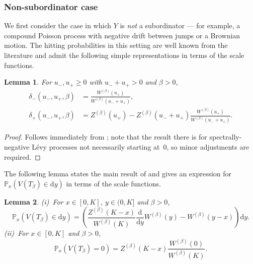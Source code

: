 \documentclass[reqno,12pt]{amsart}
\newtheorem{lemma}{Lemma}
\begin{document}
\subsubsection*{Non-subordinator case}\label{sec: prelim non-sub}
We first consider the case in which $Y$ is {\it not} a subordinator — for example, a compound Poisson process with negative drift between jumps or a Brownian motion. The hitting probabilities in this setting are well known from the literature and admit the following simple representations in terms of the scale functions.
\begin{lemma}\label{lemma: deltas Lévy non subord}
    For $u_-, u_+ \geqslant 0$ with $u_-+u_+ > 0$ and $\beta>0$,
    \begin{align*}
        \delta_{-}(u_-, u_+, \beta) &= \frac{W^{(\beta)}(u_+)}{W^{(\beta)}(u_- + u_+)}, \\
        \delta_{+}(u_-, u_+, \beta) &= Z^{(\beta)}(u_+) -  Z^{(\beta)}(u_-+ u_+) \frac{W^{(\beta)}(u_+)}{W^{(\beta)}(u_- + u_+)}.
    \end{align*}
\end{lemma}
\begin{proof}
    Follows immediately from \cite[Theorem 8.1]{KYP}; note that the result there is for spectrally-negative L\'evy processes not necessarily starting at~$0$, so minor adjustments are required.
\end{proof}




The following lemma states the main result of \cite{IP} and gives an expression for $\mathbb{P}_x(V(T_\beta) \in \mathrm{d}y)$ in terms of the scale functions.

\begin{lemma}\label{lemma: dist W init x}
    {\em (i)}~For $x\in[0,K]$, $y\in(0,K]$ and $\beta>0$,
    \begin{equation}\label{eq: dens W init x Levy}
        \mathbb{P}_x\left(V(T_\beta) \in \mathrm{d}y\right) = \left(\frac{Z^{(\beta)}(K-x)}{W^{(\beta)}(K)}\frac{\mathrm{d}}{\mathrm{d}y}W^{(\beta)}(y) - W^{(\beta)}(y-x)\right) \mathrm{d}y.
    \end{equation}
    {\em (ii)}~For $x\in[0,K]$ and $\beta>0$,
    \begin{equation}\label{eq: empty prob W init x Levy}
        \mathbb{P}_x\left(V(T_\beta) = 0\right) = Z^{(\beta)}(K-x)\frac{W^{(\beta)}(0)}{W^{(\beta)}(K)}.
    \end{equation}
\end{lemma}
\end{document}
